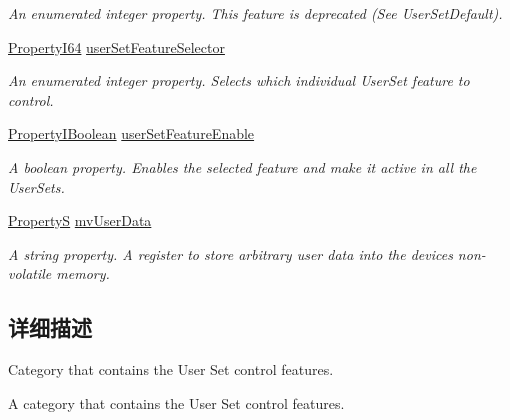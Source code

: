\begin{DoxyCompactItemize}
\begin{DoxyCompactList}\small\item\em An enumerated integer property. This feature is deprecated (See User\+Set\+Default). \end{DoxyCompactList}\item 
\hyperlink{group___common_interface_ga81749b2696755513663492664a18a893}{Property\+I64} \hyperlink{classmv_i_m_p_a_c_t_1_1acquire_1_1_gen_i_cam_1_1_user_set_control_a0f8cbd4264279a3a748cd18a92a3efa8}{user\+Set\+Feature\+Selector}
\begin{DoxyCompactList}\small\item\em An enumerated integer property. Selects which individual User\+Set feature to control. \end{DoxyCompactList}\item 
\hyperlink{group___common_interface_ga44f9437e24b21b6c93da9039ec6786aa}{Property\+I\+Boolean} \hyperlink{classmv_i_m_p_a_c_t_1_1acquire_1_1_gen_i_cam_1_1_user_set_control_ab653f7510582633a32def34eafa21eab}{user\+Set\+Feature\+Enable}
\begin{DoxyCompactList}\small\item\em A boolean property. Enables the selected feature and make it active in all the User\+Sets. \end{DoxyCompactList}\item 
\hyperlink{classmv_i_m_p_a_c_t_1_1acquire_1_1_property_s}{Property\+S} \hyperlink{classmv_i_m_p_a_c_t_1_1acquire_1_1_gen_i_cam_1_1_user_set_control_a61f312cf670c4a3415f5f57d1b9e160d}{mv\+User\+Data}
\begin{DoxyCompactList}\small\item\em A string property. A register to store arbitrary user data into the devices non-\/volatile memory. \end{DoxyCompactList}\end{DoxyCompactItemize}


\subsection{详细描述}
Category that contains the User Set control features. 

A category that contains the User Set control features. 

